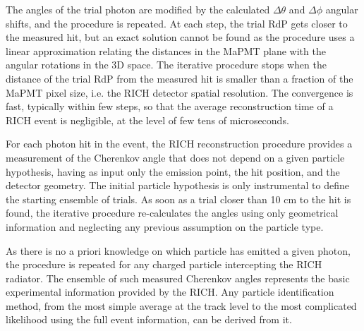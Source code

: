 The angles of the trial photon are modified by the calculated $\Delta\theta$ and $\Delta\phi$ angular shifts,
and the procedure is repeated. At each step, the trial RdP gets closer to the measured hit, but an exact solution
cannot be found as the procedure uses a linear approximation relating the distances in the MaPMT plane with the
angular rotations in the 3D space. The iterative procedure stops when the distance of the trial RdP from the
measured hit is smaller than a fraction of the MaPMT pixel size, i.e. the RICH detector spatial resolution. The
convergence is fast, typically within few steps, so that the average reconstruction time of a RICH event is negligible,
at the level of few tens of microseconds.

For each photon hit in the event, the RICH reconstruction procedure provides a measurement of the Cherenkov
angle that does not depend on a given particle hypothesis, having as input only the emission point, the hit position,
and the detector geometry. The initial particle hypothesis is only instrumental to define the starting ensemble of
trials. As soon as a trial closer than 10 cm to the hit is found, the iterative procedure re-calculates the angles using
only geometrical information and neglecting any previous assumption on the particle type.

As there is no a priori knowledge on which particle has emitted a given photon, the procedure is repeated for any
charged particle intercepting the RICH radiator. The ensemble of such measured Cherenkov angles represents
the basic experimental information provided by the RICH. Any particle identification method, from the most
simple average at the track level to the most complicated likelihood using the full event information, can be derived
from it.
